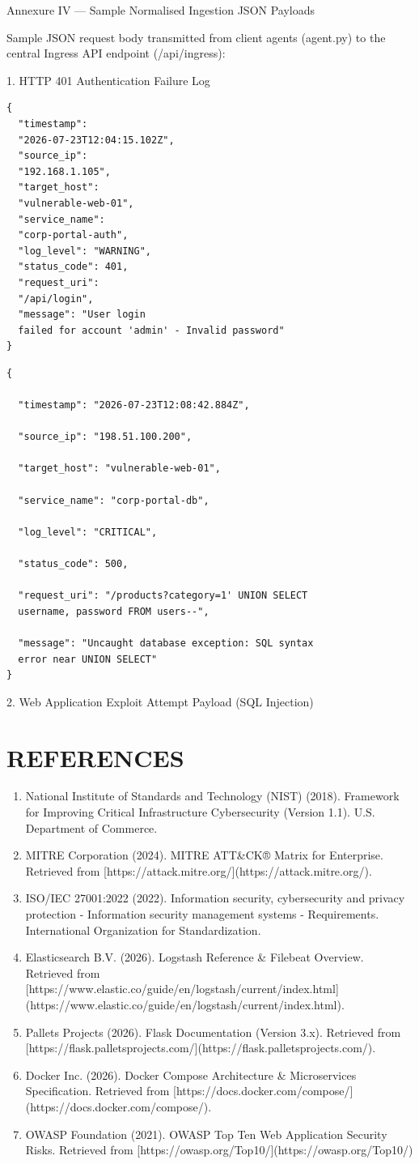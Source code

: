 Annexure IV — Sample Normalised Ingestion JSON Payloads

Sample JSON request body transmitted from client agents (agent.py) to the central Ingress API endpoint (/api/ingress):

1. HTTP 401 Authentication Failure Log

\begin{verbatim}
{
  "timestamp":
  "2026-07-23T12:04:15.102Z",
  "source_ip":
  "192.168.1.105",
  "target_host":
  "vulnerable-web-01",
  "service_name":
  "corp-portal-auth",
  "log_level": "WARNING",
  "status_code": 401,
  "request_uri":
  "/api/login",
  "message": "User login
  failed for account 'admin' - Invalid password"
}
\end{verbatim}

\begin{verbatim}
{
 
  "timestamp": "2026-07-23T12:08:42.884Z",
 
  "source_ip": "198.51.100.200",
 
  "target_host": "vulnerable-web-01",
 
  "service_name": "corp-portal-db",
 
  "log_level": "CRITICAL",
 
  "status_code": 500,
 
  "request_uri": "/products?category=1' UNION SELECT
  username, password FROM users--",
 
  "message": "Uncaught database exception: SQL syntax
  error near UNION SELECT"
}
\end{verbatim}

2. Web Application Exploit Attempt Payload (SQL Injection)

\newpage
\chapter*{REFERENCES}

\begin{enumerate}
  \item National Institute of Standards and Technology (NIST) (2018). Framework for Improving Critical Infrastructure Cybersecurity (Version 1.1). U.S. Department of Commerce.
  \item MITRE Corporation (2024). MITRE ATT\&CK® Matrix for Enterprise. Retrieved from [https://attack.mitre.org/](https://attack.mitre.org/).
  \item ISO/IEC 27001:2022 (2022). Information security, cybersecurity and privacy protection - Information security management systems - Requirements. International Organization for Standardization.
  \item Elasticsearch B.V. (2026). Logstash Reference \& Filebeat Overview. Retrieved from [https://www.elastic.co/guide/en/logstash/current/index.html](https://www.elastic.co/guide/en/logstash/current/index.html).
  \item Pallets Projects (2026). Flask Documentation (Version 3.x). Retrieved from [https://flask.palletsprojects.com/](https://flask.palletsprojects.com/).
  \item Docker Inc. (2026). Docker Compose Architecture \& Microservices Specification. Retrieved from [https://docs.docker.com/compose/](https://docs.docker.com/compose/).
  \item OWASP Foundation (2021). OWASP Top Ten Web Application Security Risks. Retrieved from [https://owasp.org/Top10/](https://owasp.org/Top10/)
\end{enumerate}

